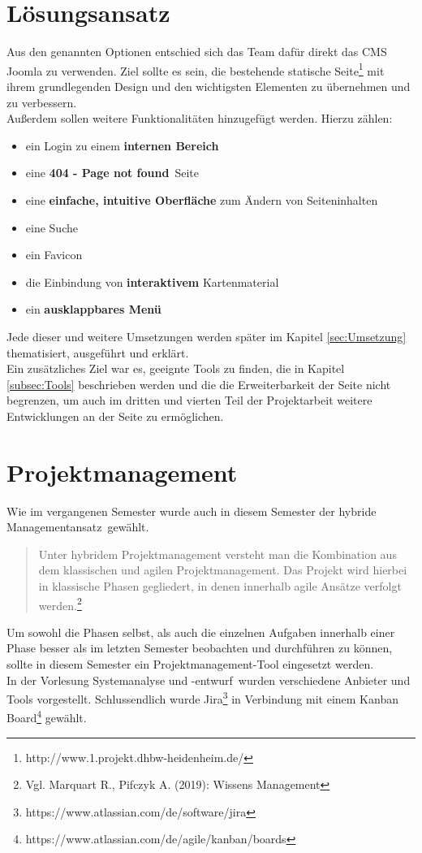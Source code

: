 \documentclass[12pt,a4paper]{article}
\begin{document}
\section{Lösungsansatz}
Aus den genannten Optionen entschied sich das Team dafür direkt das CMS Joomla zu verwenden. Ziel sollte es sein, die bestehende statische Seite\footnote{\label{foot:Alte_Seite} http://www.1.projekt.dhbw-heidenheim.de/} mit ihrem grundlegenden Design und den wichtigsten Elementen zu übernehmen und zu verbessern.\\
Außerdem sollen weitere Funktionalitäten hinzugefügt werden. Hierzu zählen:
\begin{itemize}
\item ein Login zu einem \textbf{internen Bereich}
\item eine \glqq \textbf{404 - Page not found}\grqq \ Seite
\item eine \textbf{einfache, intuitive Oberfläche} zum Ändern von Seiteninhalten
\item eine Suche
\item ein Favicon
\item die Einbindung von \textbf{interaktivem} Kartenmaterial
\item ein \textbf{ausklappbares Menü}
\end{itemize}
Jede dieser und weitere Umsetzungen werden später im Kapitel \ref{sec:Umsetzung} thematisiert, ausgeführt und erklärt.\\
Ein zusätzliches Ziel war es, geeignte Tools zu finden, die in Kapitel \ref{subsec:Tools} beschrieben werden und die die Erweiterbarkeit der Seite nicht begrenzen, um auch im dritten und vierten Teil der Projektarbeit weitere Entwicklungen an der Seite zu ermöglichen.


\newpage
\section{Projektmanagement}
Wie im vergangenen Semester wurde auch in diesem Semester der \glqq hybride Managementansatz\grqq \ gewählt. 
\begin{quote}
Unter hybridem Projektmanagement versteht man die Kombination aus dem klassischen und agilen Projektmanagement. Das Projekt wird hierbei in klassische Phasen gegliedert, in denen innerhalb agile Ansätze verfolgt werden.\footnote{\label{foot:hybrid} Vgl. Marquart R., Pifczyk A. (2019): Wissens Management}
\end{quote}
Um sowohl die Phasen selbst, als auch die einzelnen Aufgaben innerhalb einer Phase besser als im letzten Semester beobachten und durchführen zu können, sollte in diesem Semester ein Projektmanagement-Tool eingesetzt werden.\\
In der Vorlesung \glqq Systemanalyse und -entwurf\grqq \ wurden verschiedene Anbieter und Tools vorgestellt. Schlussendlich wurde Jira\footnote{\label{foot:Jira} https://www.atlassian.com/de/software/jira} in Verbindung mit einem Kanban Board\footnote{\label{foot:kanban} https://www.atlassian.com/de/agile/kanban/boards} gewählt.\\
\end{document}
